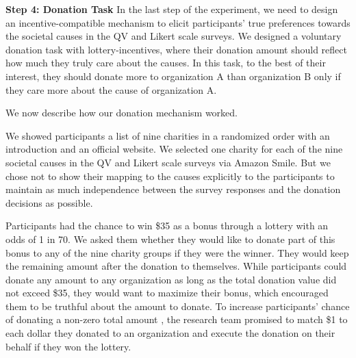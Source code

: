 \textbf{Step 4: Donation Task} In the last step of the experiment, we need to design an incentive-compatible mechanism to elicit participants' true preferences towards the societal causes in the QV and Likert scale surveys. We designed a {} voluntary donation task with lottery-incentives, where their donation amount should reflect how much they truly care about the causes. In this task, to the best of their interest, they should donate more to organization A than organization B only if they care more about the cause of organization A. 

{} We now describe how our donation mechanism worked.

We showed participants a list of nine charities in a randomized order with an introduction and an official website. We selected one charity for each of the nine societal causes in the QV and Likert scale surveys via Amazon Smile. But we chose not to show their mapping to the causes explicitly to the participants to maintain as much independence between the survey responses and the donation decisions as possible. 

Participants had the chance to win \$35 as a bonus through a lottery with an odds of 1 in 70. We asked them whether they would like to donate part of this bonus to any of the nine charity groups if they were the winner. They would keep the remaining amount after the donation to themselves. While participants could donate any amount to any organization as long as the total donation value did not exceed \$35, they would want to maximize their bonus, which encouraged them to be truthful about the amount to donate. To increase participants' chance of donating a non-zero total amount {}, the research team promised to match \$1 to each dollar they donated to an organization and execute the donation on their behalf if they won the lottery. 

